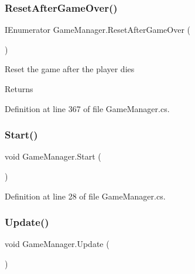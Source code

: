 \subsubsection{\texorpdfstring{Reset\+After\+Game\+Over()}{ResetAfterGameOver()}}
{\footnotesize\ttfamily I\+Enumerator Game\+Manager.\+Reset\+After\+Game\+Over (\begin{DoxyParamCaption}{ }\end{DoxyParamCaption})\hspace{0.3cm}{\ttfamily [private]}}



Reset the game after the player dies 

\begin{DoxyReturn}{Returns}

\end{DoxyReturn}


Definition at line 367 of file Game\+Manager.\+cs.

\mbox{\label{class_game_manager_a5ccfacd027ad08eeb4ff1f25a7f59c98}} 
\subsubsection{\texorpdfstring{Start()}{Start()}}
{\footnotesize\ttfamily void Game\+Manager.\+Start (\begin{DoxyParamCaption}{ }\end{DoxyParamCaption})\hspace{0.3cm}{\ttfamily [private]}}



Definition at line 28 of file Game\+Manager.\+cs.

\mbox{\label{class_game_manager_a44c79b205dec16bfe650e21259860c5b}} 
\subsubsection{\texorpdfstring{Update()}{Update()}}
{\footnotesize\ttfamily void Game\+Manager.\+Update (\begin{DoxyParamCaption}{ }\end{DoxyParamCaption})\hspace{0.3cm}{\ttfamily [private]}}



